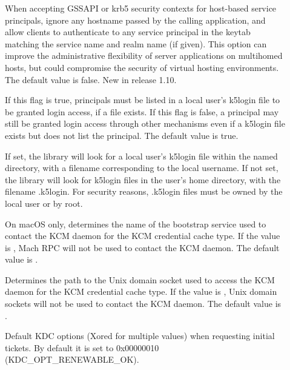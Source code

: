 \documentclass[letterpaper,10pt,english]{sphinxmanual}
\begin{document}
\begin{description}
\item[{}] \leavevmode
When accepting GSSAPI or krb5 security contexts for host-based
service principals, ignore any hostname passed by the calling
application, and allow clients to authenticate to any service
principal in the keytab matching the service name and realm name
(if given).  This option can improve the administrative
flexibility of server applications on multihomed hosts, but could
compromise the security of virtual hosting environments.  The
default value is false.  New in release 1.10.

\item[{}] \leavevmode
If this flag is true, principals must be listed in a local user’s
k5login file to be granted login access, if a 
file exists.  If this flag is false, a principal may still be
granted login access through other mechanisms even if a k5login
file exists but does not list the principal.  The default value is
true.

\item[{}] \leavevmode
If set, the library will look for a local user’s k5login file
within the named directory, with a filename corresponding to the
local username.  If not set, the library will look for k5login
files in the user’s home directory, with the filename .k5login.
For security reasons, .k5login files must be owned by
the local user or by root.

\item[{}] \leavevmode
On macOS only, determines the name of the bootstrap service used to
contact the KCM daemon for the KCM credential cache type.  If the
value is \sphinxcode{-}, Mach RPC will not be used to contact the KCM
daemon.  The default value is .

\item[{}] \leavevmode
Determines the path to the Unix domain socket used to access the
KCM daemon for the KCM credential cache type.  If the value is
\sphinxcode{-}, Unix domain sockets will not be used to contact the KCM
daemon.  The default value is
.

\item[{}] \leavevmode
Default KDC options (Xored for multiple values) when requesting
initial tickets.  By default it is set to 0x00000010
(KDC\_OPT\_RENEWABLE\_OK).


\end{description}
\end{document}
